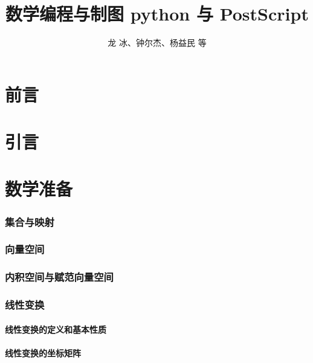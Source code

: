 \documentclass[zihao=-4,linespread=1.5,heading=true,a4paper,twoside]{ctexart}
\title{数学编程与制图 python 与 PostScript}
\author{龙 冰、钟尔杰、杨益民 等}
\begin{document}
\begin{titlepage}
	\maketitle
\end{titlepage}

\part*{前言}\label{sec:preface}


\newpage\tableofcontents

\newpage\part{引言}

\newpage\part{数学准备}
\section{集合与映射}\label{sec:II.1}


\section{向量空间}\label{sec:II.2}


\section{内积空间与赋范向量空间}\label{sec:II.3}


\section{线性变换}\label{sec:II.4}
\subsection{线性变换的定义和基本性质}\label{sec:II.4.1}


\subsection{线性变换的坐标矩阵}\label{sec:II.4.2}

\end{document}
